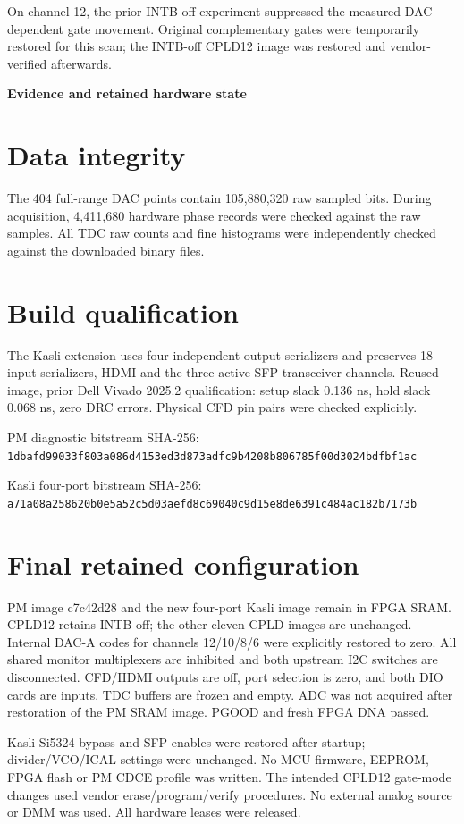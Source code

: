 \documentclass[11pt,a4paper]{article}
\begin{document}
On channel 12, the prior INTB-off experiment suppressed the measured DAC-dependent
gate movement. Original complementary gates were temporarily restored for this
scan; the INTB-off CPLD12 image was restored and vendor-verified afterwards.

\newpage
{\color{navy}\Large\bfseries Evidence and retained hardware state}\par
\section*{Data integrity}
The 404 full-range DAC points contain 105,880,320 raw sampled bits.
During acquisition, 4,411,680 hardware phase records were checked against the
raw samples. All TDC raw counts and fine histograms were independently checked
against the downloaded binary files.

\section*{Build qualification}
The Kasli extension uses four independent output serializers and preserves
18 input serializers, HDMI and the three active SFP transceiver channels.
Reused image, prior Dell Vivado 2025.2 qualification: setup slack 0.136 ns, hold slack 0.068 ns,
zero DRC errors. Physical CFD pin pairs were checked explicitly.

PM diagnostic bitstream SHA-256:\\
\texttt{1dbafd99033f803a086d4153ed3d873adfc9b4208b806785f00d3024bdfbf1ac}

Kasli four-port bitstream SHA-256:\\
\texttt{a71a08a258620b0e5a52c5d03aefd8c69040c9d15e8de6391c484ac182b7173b}

\section*{Final retained configuration}
PM image c7c42d28 and the new four-port Kasli image remain in FPGA SRAM.
CPLD12 retains INTB-off; the other eleven CPLD images are unchanged.
Internal DAC-A codes for channels 12/10/8/6 were explicitly restored to zero.
All shared monitor multiplexers are inhibited and both upstream I2C switches
are disconnected. CFD/HDMI outputs are off, port selection is zero, and both
DIO cards are inputs. TDC buffers are frozen and empty. ADC was not acquired
after restoration of the PM SRAM image. PGOOD and fresh FPGA DNA passed.

Kasli Si5324 bypass and SFP enables were restored after startup; divider/VCO/ICAL
settings were unchanged. No MCU firmware, EEPROM, FPGA flash or PM CDCE profile
was written. The intended
CPLD12 gate-mode changes used vendor erase/program/verify procedures.
No external analog source or DMM was used. All hardware leases were released.
\end{document}
